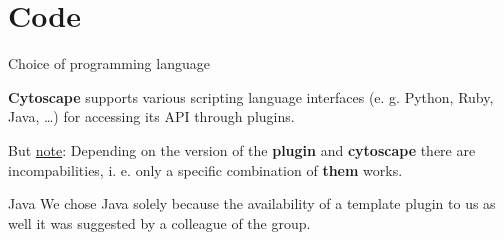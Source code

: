 \section{Code}
\begin{frame}{Choice of programming language}
\begin{remark}
\textbf{Cytoscape} supports various scripting language interfaces (e. g. Python, Ruby, Java, \dots) for accessing its API through plugins. \\
\end{remark}
But \underline{note}: Depending on the version of the \textbf{plugin} and \textbf{cytoscape} there are incompabilities, i. e. only a specific combination of \textbf{them} works.
\pause
\begin{exampleblock}{Java}
We chose Java solely because the availability of a template plugin to us as well it was suggested by a colleague of the group.
\end{exampleblock}
\end{frame}

